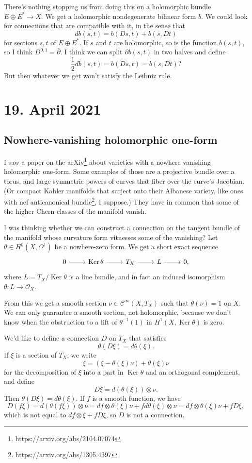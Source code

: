 \documentclass[11pt]{article}
\theoremstyle{definition}
\newcommand{\cc}[1]{\mathcal{#1}}
\DeclareMathOperator{\Ker}{Ker}
\begin{document}
There's nothing stopping us from doing this on a holomorphic bundle $E \oplus E^* \to X$. We get a holomorphic nondegenerate bilinear form $b$. We could look for connections that are compatible with it, in the sense that
\[
d b(s, t) = b(Ds, t) + b(s, Dt)
\]
for sections $s, t$ of $E \oplus E^*$. If $s$ and $t$ are holomorphic, so is the function $b(s, t)$, so I think $D^{0,1} = \bar\partial$. I think we can split $\partial b(s, t)$ in two halves and define
\[
\frac 12 d b(s, t) = b(Ds, t) = b(s, Dt)?
\]
But then whatever we get won't satisfy the Leibniz rule.


\section*{19. April 2021}
\subsection*{Nowhere-vanishing holomorphic one-form}


I saw a paper on the arXiv\footnote{https://arxiv.org/abs/2104.07074} about varieties with a nowhere-vanishing holomorphic one-form. Some examples of those are a projective bundle over a torus, and large symmetric powers of curves that fiber over the curve's Jacobian. (Or compact Kahler manifolds that surject onto their Albanese variety, like ones with nef anticanonical bundle\footnote{https://arxiv.org/abs/1305.4397}, I suppose.) They have in common that some of the higher Chern classes of the manifold vanish.

I was thinking whether we can construct a connection on the tangent bundle of the manifold whose curvature form vitnesses some of the vanishing? Let $\theta \in H^0(X, \Omega^1)$ be a nowhere-zero form. We get a short exact sequence
\[
\begin{tikzcd}
0 \ar[r] &
\Ker \theta \ar[r] &
T_X \ar[r] &
L \ar[r] &
0,
\end{tikzcd}
\]
where $L = T_X / \Ker \theta$ is a line bundle, and in fact an induced isomorphism $\theta : L \to \cc O_X$.

From this we get a smooth section $\nu \in \cc C^\infty(X, T_X)$ such that $\theta(\nu) = 1$ on $X$. We can only guarantee a smooth section, not holomorphic, because we don't know when the obstruction to a lift of $\theta^{-1}(1)$ in $H^1(X, \Ker \theta)$ is zero.


We'd like to define a connection $D$ on $T_X$ that satisfies
\[
\theta(D\xi) = d \theta(\xi).
\]
If $\xi$ is a section of $T_X$, we write
\[
\xi = (\xi - \theta(\xi)\nu) + \theta(\xi) \nu
\]
for the decomposition of $\xi$ into a part in $\Ker \theta$ and an orthogonal complement,
and define
\[
D\xi = d(\theta(\xi)) \otimes \nu.
\]
Then $\theta(D\xi) = d \theta(\xi)$. If $f$ is a smooth function, we have
\[
D(f\xi)
= d(\theta(f\xi)) \otimes \nu
= df \otimes \theta(\xi) \nu + f d\theta(\xi) \otimes \nu
= df \otimes \theta(\xi) \nu + f D\xi,
\]
which is not equal to $df \otimes \xi + f D\xi$,
so $D$ is not a connection.
\end{document}
